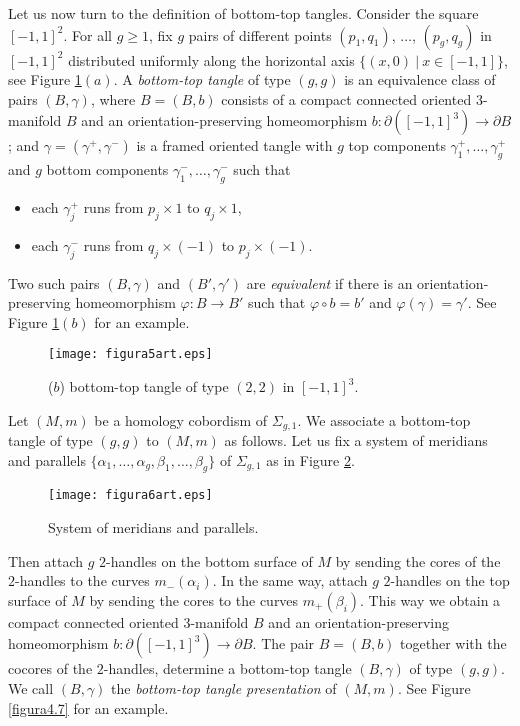 \documentclass[10pt]{amsart}
\numberwithin{equation}{section}
\numberwithin{equation}{section}
\theoremstyle{definition}
\begin{document}
Let us now turn to the definition of bottom-top tangles. Consider the square $[-1,1]^2$. For all $g\geq 1$, fix $g$ pairs of different points $(p_1,q_1)$,  $\ldots$, $(p_g, q_g)$ in $[-1,1]^2$ distributed uniformly along the horizontal axis $\{(x,0)\ |\ x\in[-1,1]\}$, see Figure \ref{figura4.5}$(a)$. A \emph{bottom-top tangle} of type $(g,g)$ is an equivalence class of  pairs $(B,\gamma)$, where $B=(B,b)$ consists of a compact connected oriented $3$-manifold $B$ and an orientation-preserving homeomorphism $b:\partial([-1,1]^3)\rightarrow \partial B$; and $\gamma=(\gamma^+,\gamma^-)$ is a framed oriented tangle with $g$ top components $\gamma_1^+,\ldots,\gamma_g^+$ and $g$ bottom components $\gamma_1^-,\ldots,\gamma_g^-$ such that
\begin{itemize}
\item each $\gamma_j^+$ runs from $p_j\times 1$ to $q_j\times1$,
\item each $\gamma_j^-$ runs from $q_j\times (-1)$ to $p_j\times(-1)$.
\end{itemize}




\noindent Two such pairs $(B,\gamma)$ and $(B',\gamma')$ are \emph{equivalent} if there is an orientation-preserving homeomorphism $\varphi:B\rightarrow B'$ such that $\varphi\circ b=b'$ and $\varphi(\gamma)=\gamma'$. See Figure \ref{figura4.5}$(b)$ for an example.
\begin{figure}[ht!]
										\centering
                        \texttt{[image: figura5art.eps]}
												\caption{($b$)  bottom-top tangle of type $(2,2)$ in $[-1,1]^{3}$.}
												\label{figura4.5}
\end{figure}



Let $(M,m)$ be a homology cobordism of  $\Sigma_{g,1}$. We associate a bottom-top tangle of type $(g,g)$ to $(M,m)$ as follows. Let us   fix a system of meridians and parallels $\{\alpha_1,\ldots,\alpha_g,\beta_1,\ldots,\beta_g\}$ of $\Sigma_{g,1}$ as  in  Figure \ref{figura3.0}. 

\begin{figure}[ht!] 
										\centering
                        \texttt{[image: figura6art.eps]}
												\caption{System of meridians and parallels.}
												\label{figura3.0}
\end{figure}

\noindent Then  attach $g$  $2$-handles  on the bottom surface of $M$ by sending the cores of the $2$-handles to the curves $m_-(\alpha_i)$. In the same way,  attach $g$ $2$-handles on the top surface of $M$ by sending the cores to the curves $m_+(\beta_i)$. This way we obtain a compact connected oriented $3$-manifold $B$ and an orientation-preserving homeomorphism $b:\partial([-1,1]^3)\rightarrow\partial B$. The pair $B=(B,b)$ together with the cocores of the $2$-handles, determine a bottom-top tangle $(B,\gamma)$ of type $(g,g)$. We call $(B,\gamma)$ the \emph{bottom-top tangle presentation} of $(M,m)$. See Figure \ref{figura4.7} for an example.
\end{document}
